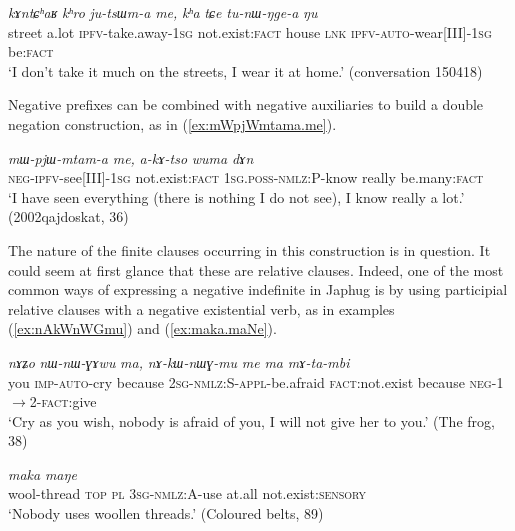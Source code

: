 \documentclass[oneside,a4paper,11pt]{article}
\newcommand{\ipa}[1]{\textit{\phon#1}}
\newcommand{\refb}[1]{(\ref{#1})}
\begin{document}
 \begin{exe}
\ex \label{jutsuma.me}
\gll 
    \ipa{kɤntɕʰaʁ} 	\ipa{kʰro} 	\ipa{ju-tsɯm-a} 	\ipa{me,} 	\ipa{kʰa} 	\ipa{tɕe} 	\ipa{tu-nɯ-ŋge-a} 	\ipa{ŋu} \\
    street a.lot \textsc{ipfv}-take.away-\textsc{1sg} not.exist:\textsc{fact} house \textsc{lnk} \textsc{ipfv-auto}-wear[III]-\textsc{1sg} be:\textsc{fact} \\
\glt `I don't take it much on the streets, I wear it at home.' (conversation 150418)
\end{exe} 

Negative prefixes can be combined with negative auxiliaries to build a double negation construction, as in \refb{ex:mWpjWmtama.me}. 
 \begin{exe}
\ex \label{ex:mWpjWmtama.me}
\gll 
  \ipa{mɯ-pjɯ-mtam-a} 	\ipa{me,} 	\ipa{a-kɤ-tso} 	\ipa{wuma} 	\ipa{dɤn} \\
  \textsc{neg-ipfv}-see[III]-\textsc{1sg} not.exist:\textsc{fact} \textsc{1sg.poss-nmlz}:P-know really be.many:\textsc{fact} \\
\glt `I have seen everything (there is nothing I do not see), I know really a lot.' (2002qajdoskat, 36)
\end{exe} 

The nature of the finite clauses occurring in this construction is in question. It could seem at first glance that these are relative clauses. Indeed, one of the most common ways of expressing a negative indefinite in Japhug is by using participial relative clauses with a negative existential verb, as in examples \refb{ex:nAkWnWGmu} and \refb{ex:maka.maNe}.

\begin{exe}
   \ex  \label{ex:nAkWnWGmu}
\gll   
\ipa{nɤʑo}  	\ipa{nɯ-nɯ-ɣɤwu}  	\ipa{ma,}  	\ipa{nɤ-kɯ-nɯɣ-mu}  	\ipa{me}  	\ipa{ma}  	\ipa{mɤ-ta-mbi}  \\
you \textsc{imp-auto}-cry because \textsc{2sg-nmlz:S-appl}-be.afraid \textsc{fact}:not.exist because \textsc{neg-1$\rightarrow$2-fact}:give \\
\glt `Cry as you wish, nobody is afraid of you, I will not give her to you.'  (The frog, 38)
\end{exe}

\begin{exe}
   \ex  \label{ex:maka.maNe}
\gll   
[\ipa{smɤɣ-ri}  	\ipa{nɯ}  	\ipa{ra}  	\ipa{ɯ-kɯ-ntɕhoz}]  	\ipa{maka}  	\ipa{maŋe}   \\
wool-thread \textsc{top} \textsc{pl} \textsc{3sg-nmlz:A}-use at.all not.exist:\textsc{sensory}  \\
\glt `Nobody uses woollen threads.' (Coloured belts, 89)
\end{exe}
\end{document}
